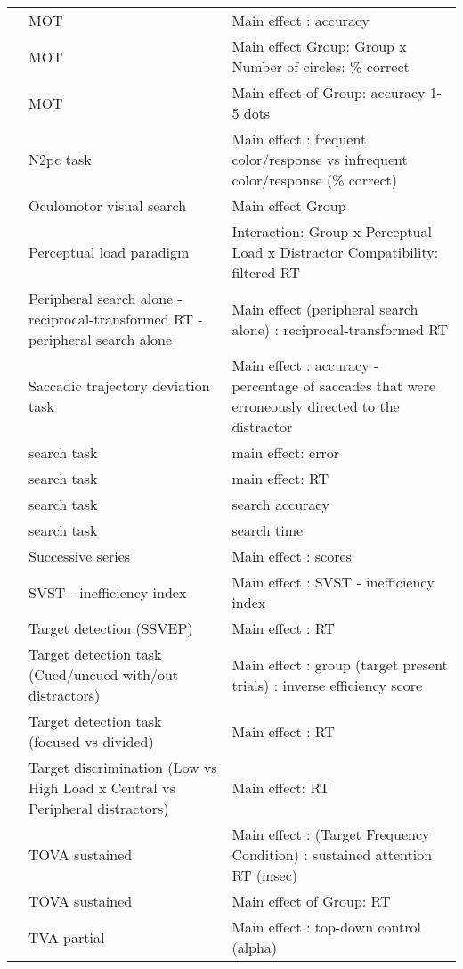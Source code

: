 \documentclass[
]{book}
\begin{document}
\begin{tabular}{l|l|l}
\cline{2-3}
 & MOT & Main effect : accuracy\\
\cline{2-3}
 & MOT & Main effect Group: Group x Number of circles: \% correct\\
\cline{2-3}
 & MOT & Main effect of Group: accuracy 1-5 dots\\
\cline{2-3}
 & N2pc task & Main effect : frequent color/response vs infrequent color/response (\% correct)\\
\cline{2-3}
 & Oculomotor visual search & Main effect Group\\
\cline{2-3}
 & Perceptual load paradigm & Interaction: Group x Perceptual Load x Distractor Compatibility: filtered RT\\
\cline{2-3}
 & Peripheral search alone - reciprocal-transformed RT - peripheral search alone & Main effect (peripheral search alone) : reciprocal-transformed RT\\
\cline{2-3}
 & Saccadic trajectory deviation task & Main effect : accuracy - percentage of saccades that were erroneously directed to the distractor\\
\cline{2-3}
 & search task & main effect: error\\
\cline{2-3}
 & search task & main effect: RT\\
\cline{2-3}
 & search task & search accuracy\\
\cline{2-3}
 & search task & search time\\
\cline{2-3}
 & Successive series & Main effect : scores\\
\cline{2-3}
 & SVST - inefficiency index & Main effect : SVST - inefficiency index\\
\cline{2-3}
 & Target detection (SSVEP) & Main effect : RT\\
\cline{2-3}
 & Target detection task (Cued/uncued with/out distractors) & Main effect : group (target present trials) : inverse efficiency score\\
\cline{2-3}
 & Target detection task (focused vs divided) & Main effect : RT\\
\cline{2-3}
 & Target discrimination (Low vs High Load x Central vs Peripheral distractors) & Main effect: RT\\
\cline{2-3}
 & TOVA sustained & Main effect : (Target Frequency Condition) : sustained attention RT (msec)\\
\cline{2-3}
 & TOVA sustained & Main effect of Group: RT\\
\cline{2-3}
 & TVA partial & Main effect : top-down control (alpha)\\

\end{tabular}
\end{document}
